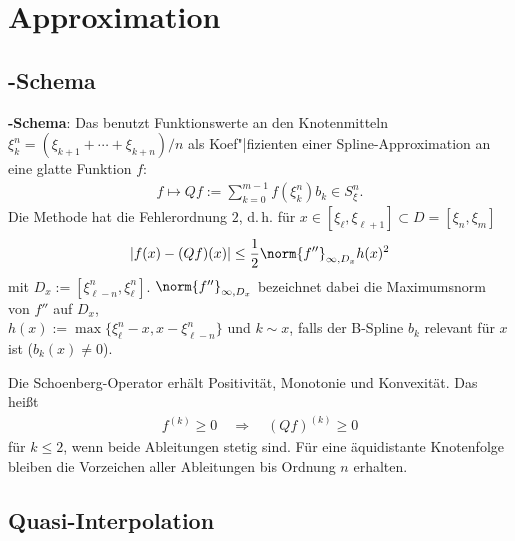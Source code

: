 \section{%
    Approximation%
}

\subsection{%
    -Schema%
}

\textbf{-Schema}:
Das  benutzt Funktionswerte an den Knotenmitteln
$\xi_k^n = (\xi_{k+1} + \dotsb + \xi_{k+n})/n$ als Koef"|fizienten einer Spline-Approximation
an eine glatte Funktion $f$:
\begin{align*}
    f \mapsto Qf := \sum_{k=0}^{m-1} f(\xi_k^n) b_k \in S_\xi^n.
\end{align*}
Die Methode hat die Fehlerordnung $2$, d.\,h. für
$x \in [\xi_\ell, \xi_{\ell+1}] \subset D = [\xi_n, \xi_m]$
\begin{align*}
    |f(x) - (Qf)(x)| \le \frac{1}{2} \norm{f''}_{\infty,D_x} h(x)^2
\end{align*}
mit $D_x := [\xi_{\ell-n}^n, \xi_\ell^n]$.
$\norm{f''}_{\infty,D_x}$ bezeichnet dabei die Maximumsnorm von $f''$ auf $D_x$,\\
$h(x) := \max\{\xi_\ell^n - x, x - \xi_{\ell-n}^n\}$ und $k \sim x$, falls
der B-Spline $b_k$ relevant für $x$ ist ($b_k(x) \not= 0$).

Die Schoenberg-Operator erhält Positivität, Monotonie und Konvexität.
Das heißt
\begin{align*}
    f^{(k)} \ge 0 \quad\Rightarrow\quad (Qf)^{(k)} \ge 0
\end{align*}
für $k \le 2$, wenn beide Ableitungen stetig sind.
Für eine äquidistante Knotenfolge bleiben die Vorzeichen
aller Ableitungen bis Ordnung $n$ erhalten.

\subsection{%
    Quasi-Interpolation%
}

